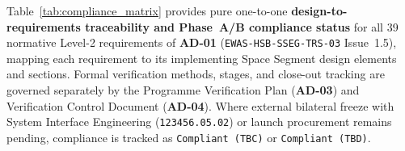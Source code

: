 Table~\ref{tab:compliance_matrix} provides pure one-to-one \textbf{design-to-requirements traceability and Phase~A/B compliance status} for all 39 normative Level-2 requirements of \textbf{AD-01} (\texttt{EWAS-HSB-SSEG-TRS-03} Issue~1.5), mapping each requirement to its implementing Space Segment design elements and  sections. Formal verification methods, stages, and close-out tracking are governed separately by the Programme Verification Plan (\textbf{AD-03}) and Verification Control Document (\textbf{AD-04}). Where external bilateral freeze with System Interface Engineering (\texttt{123456.05.02}) or launch procurement remains pending, compliance is tracked as \texttt{Compliant (TBC)} or \texttt{Compliant (TBD)}.

